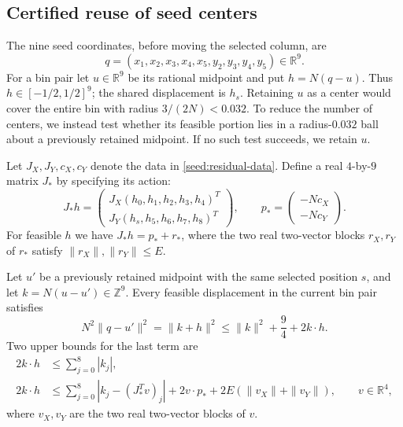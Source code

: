 \subsection{Certified reuse of seed centers}

The nine seed coordinates, before moving the selected column, are
\begin{equation}
\label{seed:nine-coordinates}
 q=(x_1,x_2,x_3,x_4,x_5,y_2,y_3,y_4,y_5)\in\mathbb R^9.
\end{equation}
For a bin pair let $u\in\mathbb R^9$ be its rational midpoint and put
$h=N(q-u)$.  Thus $h\in[-1/2,1/2]^9$; the shared displacement is $h_s$.
Retaining $u$ as a center would cover the entire bin with radius
$3/(2N)<0.032$.  To reduce the number of centers, we instead test whether
its feasible portion lies in a radius-$0.032$ ball about a previously
retained midpoint.  If no such test succeeds, we retain $u$.

Let $J_X,J_Y,c_X,c_Y$ denote the data in
\eqref{seed:residual-data}.  Define a real $4$-by-$9$ matrix $J_*$ by
specifying its action:
\begin{equation}
\label{seed:stacked-system}
 J_*h=\begin{pmatrix}
 J_X(h_0,h_1,h_2,h_3,h_4)^T\\
 J_Y(h_s,h_5,h_6,h_7,h_8)^T
 \end{pmatrix},\qquad
 p_*=\begin{pmatrix}-Nc_X\\-Nc_Y\end{pmatrix}.
\end{equation}
For feasible $h$ we have $J_*h=p_*+r_*$, where the two real two-vector
blocks $r_X,r_Y$ of $r_*$ satisfy $\|r_X\|,\|r_Y\|\le E$.

\begin{lemma}
\label{seed:dual-support}
Let $u'$ be a previously retained midpoint with the same selected position
$s$, and let $k=N(u-u')\in\mathbb Z^9$.  Every feasible displacement in
the current bin pair satisfies
\begin{equation}
\label{seed:distance-bound}
 N^2\|q-u'\|^2=\|k+h\|^2
 \le\|k\|^2+\frac94+2k\cdot h.
\end{equation}
Two upper bounds for the last term are
\begin{align}
 2k\cdot h&\le\sum_{j=0}^8|k_j|,
 \label{seed:box-support}\\
 2k\cdot h&\le
 \sum_{j=0}^8|k_j-(J_*^Tv)_j|
 +2v\cdot p_*+2E(\|v_X\|+\|v_Y\|),
 \qquad v\in\mathbb R^4,
 \label{seed:dual-formula}
\end{align}
where $v_X,v_Y$ are the two real two-vector blocks of $v$.
\end{lemma}

